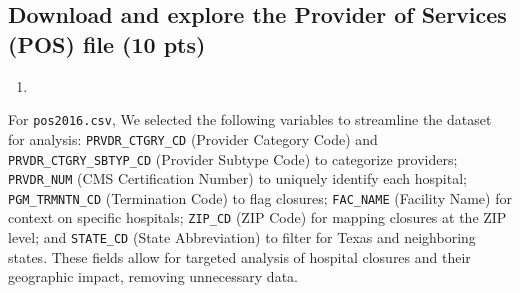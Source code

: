 \documentclass[
  letterpaper,
  DIV=11,
  numbers=noendperiod]{scrartcl}
\providecommand{\tightlist}{%
  \setlength{\itemsep}{0pt}\setlength{\parskip}{0pt}}\usepackage{longtable,booktabs,array}
\begin{document}
\subsection{Download and explore the Provider of Services (POS) file (10
pts)}\label{download-and-explore-the-provider-of-services-pos-file-10-pts}

\begin{enumerate}
\def\labelenumi{\arabic{enumi}.}
\tightlist
\item
\end{enumerate}

For \texttt{pos2016.csv}, We selected the following variables to
streamline the dataset for analysis: \texttt{PRVDR\_CTGRY\_CD} (Provider
Category Code) and \texttt{PRVDR\_CTGRY\_SBTYP\_CD} (Provider Subtype
Code) to categorize providers; \texttt{PRVDR\_NUM} (CMS Certification
Number) to uniquely identify each hospital; \texttt{PGM\_TRMNTN\_CD}
(Termination Code) to flag closures; \texttt{FAC\_NAME} (Facility Name)
for context on specific hospitals; \texttt{ZIP\_CD} (ZIP Code) for
mapping closures at the ZIP level; and \texttt{STATE\_CD} (State
Abbreviation) to filter for Texas and neighboring states. These fields
allow for targeted analysis of hospital closures and their geographic
impact, removing unnecessary data.
\end{document}
